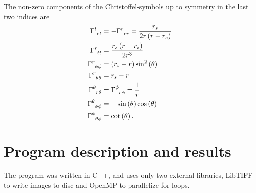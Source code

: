 \documentclass[pdftex,12pt,a4paper]{article}
\begin{document}
		The non-zero components of the Christoffel-symbols up to symmetry in the last two indices are
		\begin{equation}
			\begin{aligned}
				\tensor{\Gamma}{^t_r_t} &= -\tensor{\Gamma}{^r_r_r} = \frac{r_s}{2r\left(r-r_s\right)}\\
				\tensor{\Gamma}{^r_t_t} &= \frac{r_s\left(r-r_s\right)}{2r^3}\\
				\tensor{\Gamma}{^r_\phi_\phi} &= \left(r_s-r\right)\sin^2\left(\theta\right)\\
				\tensor{\Gamma}{^r_\theta_\theta} &= r_s - r\\
				\tensor{\Gamma}{^\theta_r_\theta} &= \tensor{\Gamma}{^\phi_r_\phi} = \frac{1}{r}\\
				\tensor{\Gamma}{^\theta_\phi_\phi} &= -\sin\left(\theta\right)\cos\left(\theta\right)\\
				\tensor{\Gamma}{^\phi_\theta_\phi} &= \cot\left(\theta\right).
			\end{aligned}
		\end{equation}
	\section{Program description and results}
		The program was written in C++, and uses only two external libraries, LibTIFF to write images to disc and OpenMP to parallelize for loops.
		
\end{document}
